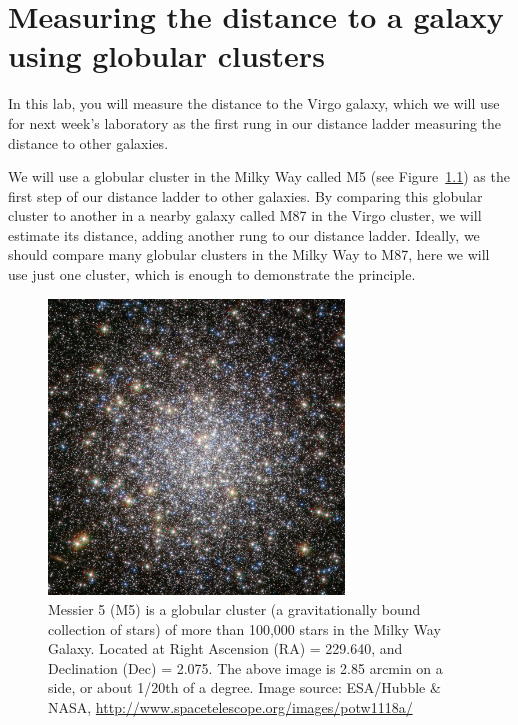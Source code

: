 \chapter{Measuring the distance to a galaxy using globular clusters}


In this lab, you will measure the distance to the Virgo galaxy, which we will use for next week’s laboratory as the first rung in our distance ladder measuring the distance to other galaxies.

We will use a globular cluster in the Milky Way called M5 (see Figure~\ref{gc:fig:m5}) as the first step of our distance
ladder to other galaxies. By comparing this globular cluster to another in a nearby galaxy
called M87 in the Virgo cluster, we will estimate its distance, adding another rung to our
distance ladder. Ideally, we should compare many globular clusters in the Milky Way to
M87, here we will use just one cluster, which is enough to demonstrate the principle.

\begin{figure}
	\centering
	\includegraphics[width=0.7\textwidth]{globular-cluster/potw1118a}
	\caption{Messier 5 (M5) is a globular cluster (a gravitationally bound collection
		of stars) of more than 100,000 stars in the Milky Way Galaxy. Located at Right
		Ascension (RA) = 229.640\textdegree, and Declination (Dec) = 2.075\textdegree.
		The above
		image is 2.85 arcmin on a side, or about 1/20th of a degree.
		Image source: ESA/Hubble \& NASA, \url{http://www.spacetelescope.org/images/potw1118a/}}\label{gc:fig:m5}
\end{figure}

